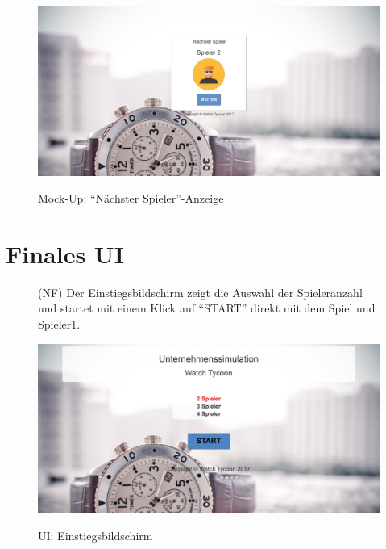 \begin{figure} 
	\centering
	\includegraphics[scale=0.1]{img/bilder_layout/MockUp8.jpg} \label{fig:abb12}
	\caption{Mock-Up: \enquote{Nächster Spieler}-Anzeige} 
\end{figure}

\clearpage
\section{Finales UI}\label{sec:final_UI} 
\begin{figure} [!h]
\begin{minipage}{\textwidth} 
(NF) Der Einstiegsbildschirm zeigt die Auswahl der Spieleranzahl und startet mit einem Klick auf \enquote{START} direkt mit dem Spiel und Spieler1.\\
\end{minipage}
	\centering
	\includegraphics[scale=0.1]{img/bilder_layout/Spiel1.jpg}
	\label{fig:abb13}
	\caption{UI: Einstiegsbildschirm} 
\end{figure}

